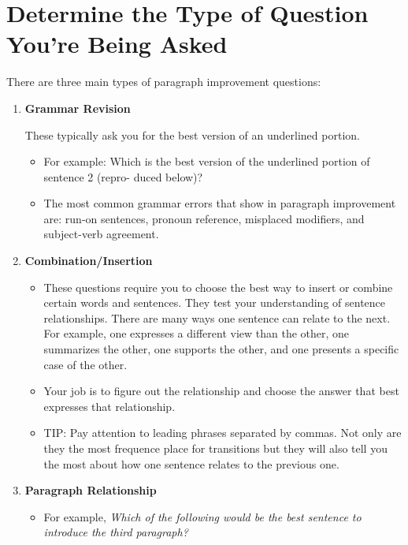 \section{Determine the Type of Question You're Being Asked}

There are three main types of paragraph improvement questions:

\begin{enumerate}
\item{\large{\textbf{Grammar Revision}}}

These typically ask you for the best version of an underlined portion. 

\begin{itemize}
\item{For example: Which is the best version of the underlined portion of sentence 2 (repro-
duced below)?}

\item{The most common grammar errors that show in paragraph improvement are: run-on sentences, pronoun reference, misplaced modifiers, and subject-verb agreement.}
\end{itemize}

\item{\large{\textbf{Combination/Insertion}}}

\begin{itemize}
\item These questions require you to choose the best way to insert or combine certain words and
sentences. They test your understanding of sentence relationships. There are many ways
one sentence can relate to the next. For example, one expresses a different view than the
other, one summarizes the other, one supports the other, and one presents a specific case of
the other.


\item Your job is to figure out the relationship and choose the answer that best expresses that
relationship.

\item{TIP: Pay attention to leading phrases separated by commas. Not only are they the
most frequence place for transitions but they will also tell you the most about how one
sentence relates to the previous one.}
\end{itemize}

\item{\large{\textbf{Paragraph Relationship}}}

\begin{itemize}
\item{For example,}
\textit{Which of the following would be the best sentence to introduce the third paragraph?}
\begin{enumerate}[label=(\Alph*)]


\end{enumerate}
\end{itemize}
\end{enumerate}
